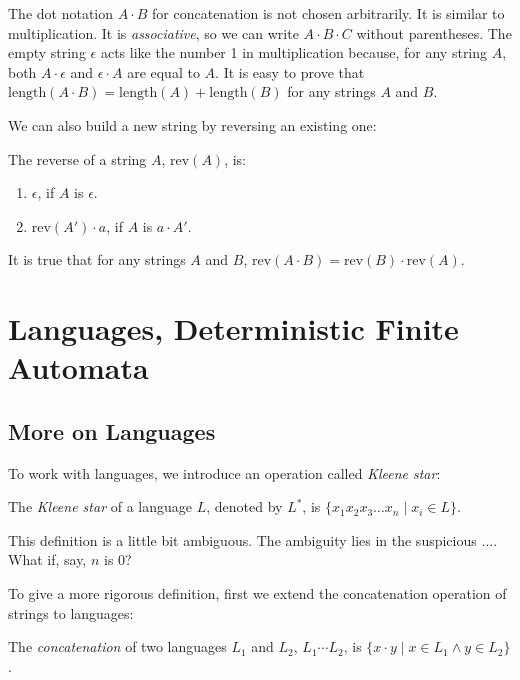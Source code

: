 \documentclass[11pt]{article}
\begin{document}
The dot notation $A \cdot B$ for concatenation is not chosen arbitrarily. It is similar to multiplication. It is \emph{associative}, so we can write $A \cdot B \cdot C$ without parentheses. The empty string $\epsilon$ acts like the number 1 in multiplication because, for any string $A$, both $A \cdot \epsilon$ and $\epsilon \cdot A$ are equal to $A$. It is easy to prove that $\mathrm{length}(A \cdot B) = \mathrm{length}(A) + \mathrm{length}(B)$ for any strings $A$ and $B$.

We can also build a new string by reversing an existing one:
\begin{definition}
The reverse of a string $A$, $\mathrm{rev}(A)$, is:
\begin{enumerate}
\item $\epsilon$, if $A$ is $\epsilon$.
\item $\mathrm{rev}(A') \cdot a$, if $A$ is $a \cdot A'$.
\end{enumerate}
\end{definition}

It is true that for any strings $A$ and $B$, $\mathrm{rev}(A \cdot B) = \mathrm{rev}(B) \cdot \mathrm{rev}(A)$.

\section{Languages, Deterministic Finite Automata}

\subsection{More on Languages}

To work with languages, we introduce an operation called \emph{Kleene star}:
\begin{definition}
The \emph{Kleene star} of a language $L$, denoted by $L^\ast$, is $\{x_1x_2x_3 \dots x_n \mid x_i \in L\}$.
\end{definition}

This definition is a little bit ambiguous. The ambiguity lies in the suspicious $\dots$. What if, say, $n$
is $0$?

To give a more rigorous definition, first we extend the concatenation operation of strings to languages:
\begin{definition}
The \emph{concatenation} of two languages $L_1$ and $L_2$, $L_1 \cdots L_2$, is $\{x \cdot y \mid x \in L_1 \wedge y \in L_2\}$.
\end{definition}
\end{document}
